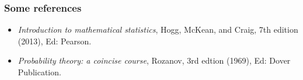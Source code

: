 \documentclass[notes=show,handout]{beamer}
\newtheorem{interpretation}{Interpretation}[section]
\begin{document}
\begin{frame}
\frametitle{Some references}


\vspace{1.5cm}
\begin{itemize}
\item \textit{Introduction to mathematical statistics}, Hogg, McKean, and Craig, 7th edition (2013), Ed: Pearson.
\vspace{0.25cm}
\item \textit{Probability theory: a coincise course}, Rozanov, 3rd edtion (1969), Ed: Dover Publication.
\end{itemize}

\end{frame}
%
%
%
%
%
%
%
\end{document}
